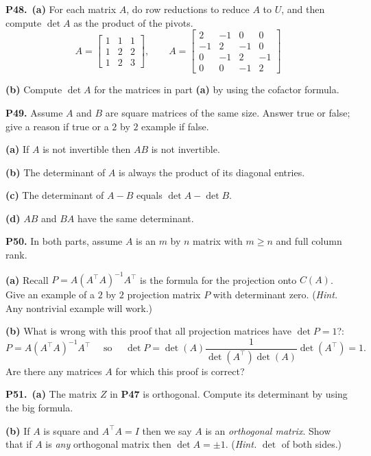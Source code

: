 \documentclass[12pt]{amsart}
\newcommand{\prob}[1]{\bigskip\noindent\textbf{#1.}\quad }
\newcommand{\epart}[1]{\medskip\noindent\textbf{(#1)}\quad }
\newcommand{\ppart}[1]{\,\textbf{(#1)}\quad }
\begin{document}
\prob{P48}  \ppart{a} For each matrix $A$, do row reductions to reduce $A$ to $U$, and then compute $\det A$ as the product of the pivots.
  $$A = \begin{bmatrix} 1 & 1 & 1 \\ 1 & 2 & 2 \\ 1 & 2 & 3 \end{bmatrix}, \qquad A = \begin{bmatrix} 2 & -1 & 0 & 0 \\ -1 & 2 & -1 & 0 \\ 0 & -1 & 2 & -1 \\ 0 & 0 & -1 & 2  \end{bmatrix}$$

\epart{b}  Compute $\det A$ for the matrices in part \textbf{(a)} by using the cofactor formula.


\clearpage\newpage
\prob{P49}  Assume $A$ and $B$ are square matrices of the same size.  Answer true or false; give a reason if true or a $2$ by $2$ example if false.

\epart{a}  If $A$ is not invertible then $AB$ is not invertible.

\epart{b}  The determinant of $A$ is always the product of its diagonal entries.

\epart{c}  The determinant of $A-B$ equals $\det A - \det B$.

\epart{d}  $AB$ and $BA$ have the same determinant.


\prob{P50}  In both parts, assume $A$ is an $m$ by $n$ matrix with $m\ge n$ and full column rank.

\epart{a} Recall $P = A (A^\top A)^{-1} A^\top$ is the formula for the projection onto $C(A)$. Give an example of a $2$ by $2$ projection matrix $P$ with determinant zero.  (\emph{Hint.}  Any nontrivial example will work.)

\epart{b}  What is wrong with this proof that all projection matrices have $\det P = 1$?:
    $$P = A (A^\top A)^{-1} A^\top \quad \text{ so } \quad \det P = \det(A) \frac{1}{\det(A^\top) \det(A)} \det(A^\top) = 1.$$
Are there any matrices $A$ for which this proof is correct?


\prob{P51}  \ppart{a}  The matrix $Z$ in \textbf{P47} is orthogonal.  Compute its determinant by using the big formula.

\epart{b}  If $A$ is square and $A^\top A = I$ then we say $A$ is an \emph{orthogonal matrix}.  Show that if $A$ is \emph{any} orthogonal matrix then $\det A = \pm 1$.  (\emph{Hint.}  $\det$ of both sides.)
\end{document}
